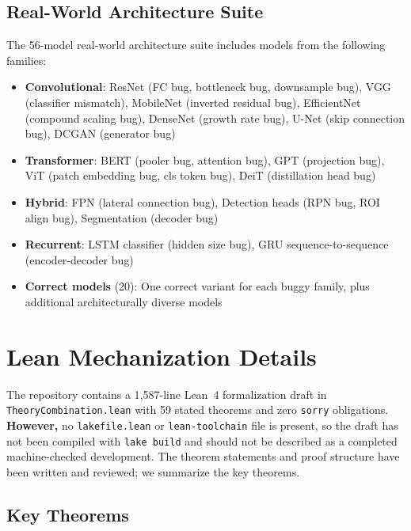 \documentclass[10pt]{article}
\theoremstyle{plain}
\theoremstyle{definition}
\theoremstyle{remark}
\begin{document}
\subsection{Real-World Architecture Suite}

The 56-model real-world architecture suite includes models from
the following families:

\begin{itemize}[nosep]
  \item \textbf{Convolutional}: ResNet (FC bug, bottleneck bug,
    downsample bug), VGG (classifier mismatch), MobileNet (inverted
    residual bug), EfficientNet (compound scaling bug), DenseNet
    (growth rate bug), U-Net (skip connection bug), DCGAN (generator
    bug)
  \item \textbf{Transformer}: BERT (pooler bug, attention bug),
    GPT (projection bug), ViT (patch embedding bug, cls token bug),
    DeiT (distillation head bug)
  \item \textbf{Hybrid}: FPN (lateral connection bug), Detection heads
    (RPN bug, ROI align bug), Segmentation (decoder bug)
  \item \textbf{Recurrent}: LSTM classifier (hidden size bug),
    GRU sequence-to-sequence (encoder-decoder bug)
  \item \textbf{Correct models} (20): One correct variant for each
    buggy family, plus additional architecturally diverse models
\end{itemize}


\section{Lean Mechanization Details}\label{app:lean}

The repository contains a 1{,}587-line Lean~4 formalization draft in
\texttt{TheoryCombination.lean} with 59 stated theorems and zero
\texttt{sorry} obligations. \textbf{However,} no \texttt{lakefile.lean}
or \texttt{lean-toolchain} file is present, so the draft has not been
compiled with \texttt{lake build} and should not be described as a
completed machine-checked development. The theorem statements and proof
structure have been written and reviewed; we summarize the
key theorems.

\subsection{Key Theorems}
\end{document}
